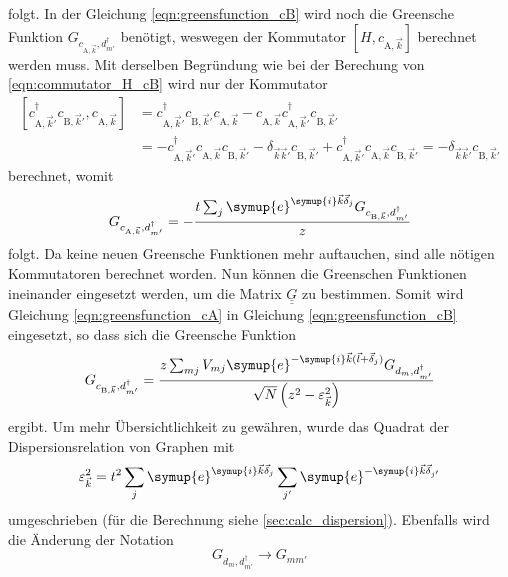 folgt.
In der Gleichung \eqref{eqn:greensfunction_cB} wird noch die Greensche Funktion $G_{c_{\text{A},\vec{k}},d^\dagger_{m'}}$ benötigt, weswegen der Kommutator
$\left [H, c_{\text{A},\vec{k}} \right ]$ berechnet werden muss.
Mit derselben Begründung wie bei der Berechung von \eqref{eqn:commutator_H_cB} wird nur der Kommutator
\begin{align*}
    \left [ c^\dagger_{\text{A},\vec{k}'} c_{\text{B},\vec{k}'}, c_{\text{A},\vec{k}} \right ]  &= c^\dagger_{\text{A},\vec{k}'}  c_{\text{B},\vec{k}'} c_{\text{A},\vec{k}}
    - c_{\text{A},\vec{k}} c^\dagger_{\text{A},\vec{k}'} c_{\text{B},\vec{k}'} \\
    &= - c^\dagger_{\text{A},\vec{k}'}  c_{\text{A},\vec{k}} c_{\text{B},\vec{k}'} - \delta_{\vec{k}\vec{k}'} c_{\text{B},\vec{k}'} 
    + c^\dagger_{\text{A},\vec{k}'} c_{\text{A},\vec{k}} c_{\text{B},\vec{k}'} = - \delta_{\vec{k}\vec{k}'} c_{\text{B},\vec{k}'} 
\end{align*}
berechnet, womit 
\begin{equation}
    G_{c_{\text{A},\vec{k}},d^\dagger_{m'}} = - \frac{t \sum_{j}\symup{e}^{\symup{i}\vec{k}\vec{\delta}_j} G_{c_{\text{B},\vec{k}}, d^\dagger_{m'}}} {z} \label{eqn:greensfunction_cA}
\end{equation}
folgt.
Da keine neuen Greensche Funktionen mehr auftauchen, sind alle nötigen Kommutatoren berechnet worden. 
Nun können die Greenschen Funktionen ineinander eingesetzt werden, um die Matrix $\underline{\underline{G}}$ zu bestimmen.
Somit wird Gleichung \eqref{eqn:greensfunction_cA} in Gleichung \eqref{eqn:greensfunction_cB} eingesetzt, so dass sich die Greensche Funktion
\begin{equation}
    G_{c_{\text{B},\vec{k}}, d^\dagger_{m'}} = \frac{z\sum_{mj} V_{mj} \symup{e}^{-\symup{i}\vec{k} (\vec{l}+\vec{\delta}_j)} G_{d_m, d_{m'}^\dagger}}
    {\sqrt{N}\left ( z^2-\varepsilon_{\vec{k}}^2 \right )} \label{eqn:finalgreencB}
\end{equation}
ergibt.
Um mehr Übersichtlichkeit zu gewähren, wurde das Quadrat der Dispersionsrelation von Graphen mit
\begin{equation*}
     \varepsilon_{\vec{k}}^2 = t^2 \sum_j \symup{e}^{\symup{i}\vec{k}\vec{\delta}_j} \sum_{j'} \symup{e}^{-\symup{i}\vec{k}\vec{\delta}_{j'}} 
\end{equation*}  
umgeschrieben (für die Berechnung siehe \ref{sec:calc_dispersion}).
Ebenfalls wird die Änderung der Notation 
\begin{equation*}
    G_{d_m, d^\dagger_{m'}} \to G_{mm'}
\end{equation*}
